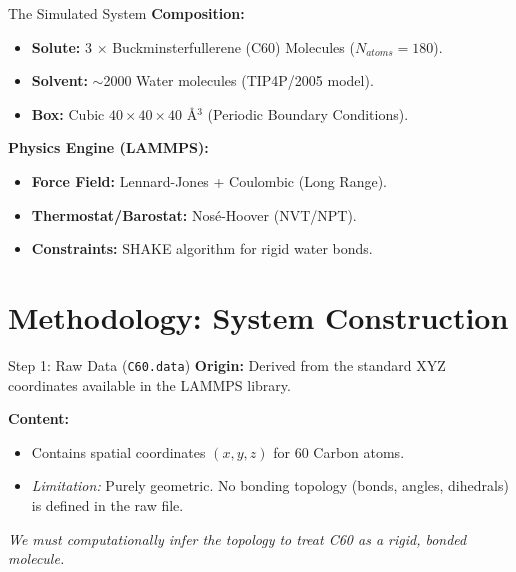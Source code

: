 \documentclass[aspectratio=169, 10pt]{beamer}
\begin{document}
\begin{frame}{The Simulated System}
    \textbf{Composition:}
    \begin{itemize}
        \item \textbf{Solute:} 3 $\times$ Buckminsterfullerene (C60) Molecules ($N_{atoms} = 180$).
        \item \textbf{Solvent:} $\sim$2000 Water molecules (TIP4P/2005 model).
        \item \textbf{Box:} Cubic $40 \times 40 \times 40$ \AA$^3$ (Periodic Boundary Conditions).
    \end{itemize}

    \vspace{0.5cm}
    \textbf{Physics Engine (LAMMPS):}
    \begin{itemize}
        \item \textbf{Force Field:} Lennard-Jones + Coulombic (Long Range).
        \item \textbf{Thermostat/Barostat:} Nosé-Hoover (NVT/NPT).
        \item \textbf{Constraints:} SHAKE algorithm for rigid water bonds.
    \end{itemize}
\end{frame}

\section{Methodology: System Construction}

\begin{frame}{Step 1: Raw Data (\texttt{C60.data})}
    \textbf{Origin:} 
    Derived from the standard XYZ coordinates available in the LAMMPS library.
    
    \vspace{0.5cm}
    \textbf{Content:}
    \begin{itemize}
        \item Contains spatial coordinates $(x, y, z)$ for 60 Carbon atoms.
        \item \textit{Limitation:} Purely geometric. No bonding topology (bonds, angles, dihedrals) is defined in the raw file.
    \end{itemize}
    
    \vspace{0.5cm}
    \textit{We must computationally infer the topology to treat C60 as a rigid, bonded molecule.}
\end{frame}
\end{document}
